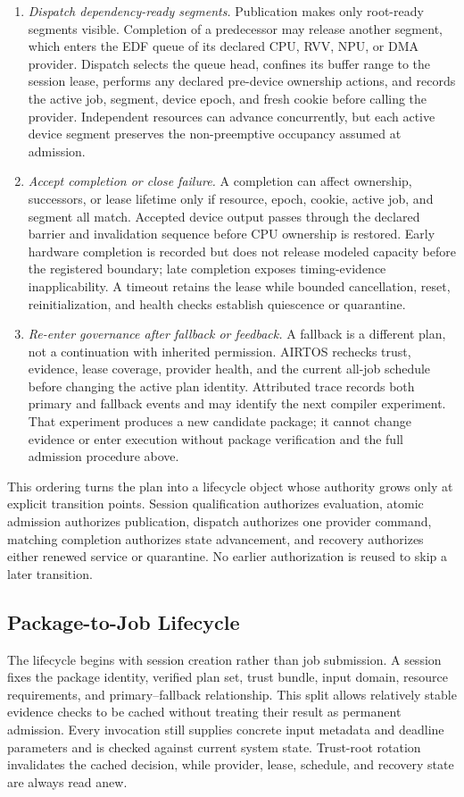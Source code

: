\documentclass[lettersize,journal]{IEEEtran}
\begin{document}
\begin{enumerate}
  \item \emph{Dispatch dependency-ready segments.} Publication makes only
  root-ready segments visible. Completion of a predecessor may release another
  segment, which enters the EDF queue of its declared CPU, RVV, NPU, or DMA
  provider. Dispatch selects the queue head, confines its buffer range to the
  session lease, performs any declared pre-device ownership actions, and
  records the active job, segment, device epoch, and fresh cookie before calling
  the provider. Independent resources can advance concurrently, but each active
  device segment preserves the non-preemptive occupancy assumed at admission.

  \item \emph{Accept completion or close failure.} A completion can affect
  ownership, successors, or lease lifetime only if resource, epoch, cookie,
  active job, and segment all match. Accepted device output passes through the
  declared barrier and invalidation sequence before CPU ownership is restored.
  Early hardware completion is recorded but does not release modeled capacity
  before the registered boundary; late completion exposes timing-evidence
  inapplicability. A timeout retains the lease while bounded cancellation,
  reset, reinitialization, and health checks establish quiescence or quarantine.

  \item \emph{Re-enter governance after fallback or feedback.} A fallback is
  a different plan, not a continuation with inherited permission. AIRTOS
  rechecks trust, evidence, lease coverage, provider health, and the current
  all-job schedule before changing the active plan identity. Attributed trace
  records both primary and fallback events and may identify the next compiler
  experiment. That experiment produces a new candidate package; it cannot
  change evidence or enter execution without package verification and the full
  admission procedure above.
\end{enumerate}

This ordering turns the plan into a lifecycle object whose authority grows only
at explicit transition points. Session qualification authorizes evaluation,
atomic admission authorizes publication, dispatch authorizes one provider
command, matching completion authorizes state advancement, and recovery
authorizes either renewed service or quarantine. No earlier authorization is
reused to skip a later transition.

\subsection{Package-to-Job Lifecycle}
The lifecycle begins with session creation rather than job submission. A
session fixes the package identity, verified plan set, trust bundle, input
domain, resource requirements, and primary--fallback relationship. This split
allows relatively stable evidence checks to be cached without treating their
result as permanent admission. Every invocation still supplies concrete input
metadata and deadline parameters and is checked against current system state.
Trust-root rotation invalidates the cached decision, while provider, lease,
schedule, and recovery state are always read anew.
\end{document}
